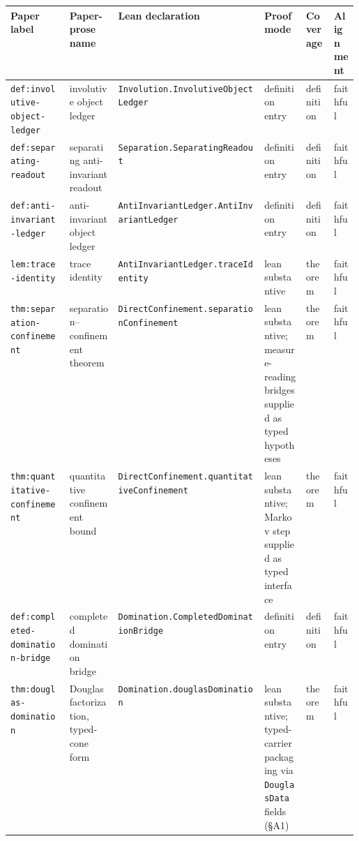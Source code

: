 \documentclass[11pt]{article}
\theoremstyle{definition}
\begin{document}
\begin{landscape}
\begin{table}[H]
\centering
\footnotesize
\setlength{\tabcolsep}{4pt}
\begin{tabularx}{\linewidth}{@{}
  >{\raggedright\arraybackslash}p{0.17\linewidth}
  >{\raggedright\arraybackslash}p{0.14\linewidth}
  >{\raggedright\arraybackslash}X
  >{\raggedright\arraybackslash}p{0.12\linewidth}
  >{\raggedright\arraybackslash}p{0.08\linewidth}
  >{\raggedright\arraybackslash}p{0.07\linewidth}@{}}
\toprule
Paper label & Paper-prose name & Lean declaration &
Proof mode & Coverage & Alignment \\
\midrule
\nolinkurl{def:involutive-object-ledger} &
involutive object ledger &
\nolinkurl{Involution.InvolutiveObjectLedger} &
definition entry &
definition &
faithful \\

\nolinkurl{def:separating-readout} &
separating anti-invariant readout &
\nolinkurl{Separation.SeparatingReadout} &
definition entry &
definition &
faithful \\

\nolinkurl{def:anti-invariant-ledger} &
anti-invariant object ledger &
\nolinkurl{AntiInvariantLedger.AntiInvariantLedger} &
definition entry &
definition &
faithful \\

\nolinkurl{lem:trace-identity} &
trace identity &
\nolinkurl{AntiInvariantLedger.traceIdentity} &
lean substantive &
theorem &
faithful \\

\nolinkurl{thm:separation-confinement} &
separation--confinement theorem &
\nolinkurl{DirectConfinement.separationConfinement} &
lean substantive; measure-reading bridges
supplied as typed hypotheses &
theorem &
faithful \\

\nolinkurl{thm:quantitative-confinement} &
quantitative confinement bound &
\nolinkurl{DirectConfinement.quantitativeConfinement} &
lean substantive; Markov step supplied as typed interface &
theorem &
faithful \\

\nolinkurl{def:completed-domination-bridge} &
completed domination bridge &
\nolinkurl{Domination.CompletedDominationBridge} &
definition entry &
definition &
faithful \\

\nolinkurl{thm:douglas-domination} &
Douglas factorization, typed-cone form &
\nolinkurl{Domination.douglasDomination} &
lean substantive; typed-carrier packaging via
\texttt{DouglasData} fields (\S A1) &
theorem &
faithful \\


\end{tabularx}
\end{table}
\end{landscape}
\end{document}
